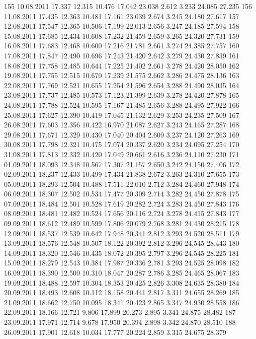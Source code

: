 \documentclass[a4paper,11pt]{scrartcl}
\begin{document}
\begin{Schunk}
\begin{Soutput}
155 10.08.2011 17.337 12.315 10.476 17.042 23.038  2.612  3.233 24.085 27.235
156 11.08.2011 17.435 12.363 10.481 17.161 23.039  2.674  3.245 24.180 27.617
157 12.08.2011 17.547 12.365 10.506 17.199 22.013  2.656  3.247 24.185 27.594
158 15.08.2011 17.685 12.434 10.608 17.232 21.459  2.659  3.265 24.320 27.731
159 16.08.2011 17.683 12.468 10.600 17.216 21.781  2.661  3.274 24.385 27.757
160 17.08.2011 17.847 12.490 10.696 17.243 21.420  2.642  3.279 24.430 27.839
161 18.08.2011 17.758 12.485 10.644 17.225 21.402  2.661  3.278 24.420 28.050
162 19.08.2011 17.755 12.515 10.670 17.239 21.575  2.662  3.286 24.475 28.136
163 22.08.2011 17.769 12.521 10.655 17.254 21.596  2.654  3.288 24.490 28.035
164 23.08.2011 17.737 12.485 10.573 17.123 21.399  2.639  3.278 24.420 27.878
165 24.08.2011 17.788 12.524 10.595 17.167 21.485  2.656  3.288 24.495 27.922
166 25.08.2011 17.627 12.390 10.419 17.045 21.132  2.629  3.253 24.235 27.509
167 26.08.2011 17.603 12.356 10.422 16.970 21.087  2.627  3.243 24.165 27.287
168 29.08.2011 17.671 12.329 10.430 17.040 20.404  2.609  3.237 24.120 27.263
169 30.08.2011 17.798 12.321 10.475 17.074 20.337  2.620  3.234 24.095 27.254
170 31.08.2011 17.813 12.332 10.420 17.049 20.661  2.616  3.236 24.110 27.230
171 01.09.2011 18.093 12.348 10.567 17.307 21.157  2.650  3.242 24.150 27.406
172 02.09.2011 18.237 12.433 10.499 17.434 21.838  2.672  3.263 24.310 27.655
173 05.09.2011 18.293 12.504 10.488 17.511 22.010  2.712  3.284 24.460 27.948
174 06.09.2011 18.307 12.502 10.534 17.477 20.309  2.714  3.282 24.450 27.878
175 07.09.2011 18.484 12.501 10.528 17.619 20.282  2.724  3.283 24.450 27.843
176 08.09.2011 18.481 12.482 10.524 17.656 20.116  2.724  3.278 24.415 27.843
177 09.09.2011 18.612 12.489 10.599 17.806 20.079  2.768  3.281 24.430 28.215
178 12.09.2011 18.537 12.539 10.642 17.948 20.341  2.812  3.293 24.520 28.511
179 13.09.2011 18.576 12.548 10.507 18.122 20.392  2.812  3.296 24.545 28.443
180 14.09.2011 18.320 12.546 10.435 18.072 20.395  2.797  3.296 24.545 28.225
181 15.09.2011 18.279 12.543 10.384 17.987 20.336  2.781  3.293 24.525 28.098
182 16.09.2011 18.390 12.509 10.310 18.047 20.287  2.786  3.285 24.465 28.067
183 19.09.2011 18.488 12.597 10.304 18.353 20.425  2.826  3.308 24.635 28.380
184 20.09.2011 18.493 12.608 10.112 18.158 20.441  2.817  3.311 24.655 28.269
185 21.09.2011 18.662 12.750 10.095 18.341 20.423  2.865  3.347 24.930 28.558
186 22.09.2011 18.166 12.721  9.806 17.899 20.273  2.895  3.341 24.875 28.482
187 23.09.2011 17.971 12.714  9.678 17.950 20.394  2.898  3.342 24.870 28.510
188 26.09.2011 17.901 12.618 10.034 17.777 20.224  2.859  3.315 24.675 28.379

\end{Soutput}
\end{Schunk}
\end{document}
